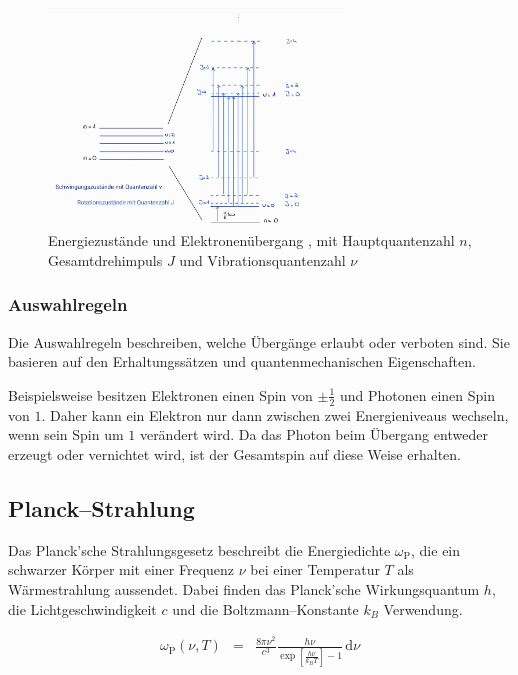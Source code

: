 \documentclass[12pt,a4paper]{scrartcl}
\numberwithin{equation}{section} %
\begin{document}
\begin{figure}[h!]
  \centering
  \includegraphics[width=0.7\textwidth]{../media/B1.1/Uebergaenge.jpg}
  \caption{Energiezustände und Elektronenübergang \cite{Agilent Technologies},
    mit Hauptquantenzahl $n$, Gesamtdrehimpuls $J$ und Vibrationsquantenzahl $\nu$}
  \label{abb:Übergänge}
\end{figure}

\subsubsection{Auswahlregeln}
Die Auswahlregeln beschreiben, welche Übergänge erlaubt oder verboten sind. Sie basieren auf den Erhaltungssätzen und quantenmechanischen Eigenschaften.

Beispielsweise besitzen Elektronen einen Spin von $\pm\frac{1}{2}$ und Photonen einen Spin von $1$. Daher kann ein Elektron nur dann zwischen zwei Energieniveaus wechseln, wenn sein Spin um $1$ verändert wird. Da das Photon beim Übergang entweder erzeugt oder vernichtet wird, ist der Gesamtspin auf diese Weise erhalten.

\hypertarget{planckstrahlung}{%
\subsection{Planck--Strahlung}\label{planckstrahlung}}

Das Planck'sche Strahlungsgesetz beschreibt die Energiedichte $\omega_\mathrm{P}$, die ein schwarzer Körper mit einer Frequenz $\nu$ bei einer Temperatur $T$ als Wärmestrahlung aussendet. Dabei finden das Planck'sche Wirkungsquantum $h$, die Lichtgeschwindigkeit $c$ und die Boltzmann--Konstante $k_B$ Verwendung. \cite{Demtröder Atom}

\begin{eqnarray}
  \omega_\mathrm{P}(\nu,T) &=&
  \frac{8\pi\nu^2}{c^3}
  \frac{h\nu}{\exp\left[\frac{h\nu}{k_BT}\right]-1}
  \,\mathrm d\nu
  \label{eq:PlackStrahlung}
\end{eqnarray}
\end{document}
